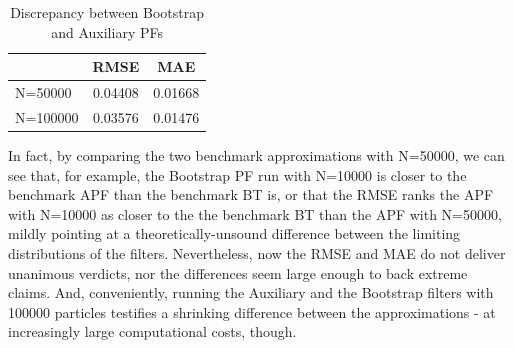 \documentclass[
]{book}
\theoremstyle{break}
\theoremstyle{nonumberplain}
\begin{document}
\begin{longtable}[t]{lcc}
\caption{\label{tab:unnamed-chunk-46}Discrepancy between Bootstrap and Auxiliary PFs}\\
\toprule
  & RMSE & MAE\\
\midrule
N=50000 & 0.04408 & 0.01668\\
N=100000 & 0.03576 & 0.01476\\
\bottomrule
\end{longtable}

In fact, by comparing the two benchmark approximations with N=50000, we
can see that, for example, the Bootstrap PF run with N=10000 is closer
to the benchmark APF than the benchmark BT is, or that the RMSE ranks
the APF with N=10000 as closer to the the benchmark BT than the APF with
N=50000, mildly pointing at a theoretically-unsound difference between
the limiting distributions of the filters. Nevertheless, now the RMSE
and MAE do not deliver unanimous verdicts, nor the differences seem
large enough to back extreme claims. And, conveniently, running the
Auxiliary and the Bootstrap filters with 100000 particles testifies a
shrinking difference between the approximations - at increasingly large
computational costs, though.\\
\end{document}
